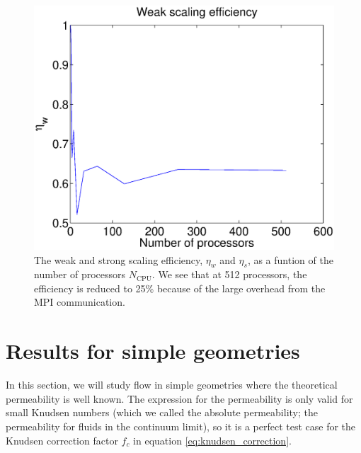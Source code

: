 \begin{figure}[h]
\begin{center}
\includegraphics[width=\textwidth, trim=0cm 0cm 0cm 0cm, clip]{DSMC/figures/weak_scaling.eps}
\end{center}
\caption{The weak and strong scaling efficiency, $\eta_w$ and $\eta_s$, as a funtion of the number of processors $N_\text{CPU}$. We see that at 512 processors, the efficiency is reduced to 25\% because of the large overhead from the MPI communication.}
\label{fig:dsmc_weak_scaling}
\end{figure}
\section{Results for simple geometries}
\label{sec:results_for_simple_geometries}
In this section, we will study flow in simple geometries where the theoretical permeability is well known. The expression for the permeability is only valid for small Knudsen numbers (which we called the absolute permeability; the permeability for fluids in the continuum limit), so it is a perfect test case for the Knudsen correction factor $f_c$ in equation \eqref{eq:knudsen_correction}. 

